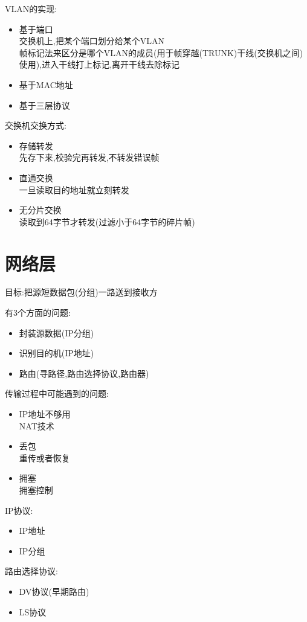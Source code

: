 \documentclass[UTF8,a4paper]{ctexart}
\begin{document}
VLAN的实现:
\begin{itemize}
  \item 基于端口\\
  交换机上,把某个端口划分给某个VLAN\\
  帧标记法来区分是哪个VLAN的成员(用于帧穿越(TRUNK)干线(交换机之间)使用),进入干线打上标记,离开干线去除标记
  \item 基于MAC地址
  \item 基于三层协议
\end{itemize}

交换机交换方式:
\begin{itemize}
  \item 存储转发\\
  先存下来,校验完再转发,不转发错误帧
  \item 直通交换\\
  一旦读取目的地址就立刻转发
  \item 无分片交换\\
  读取到64字节才转发(过滤小于64字节的碎片帧)
\end{itemize}

\section{网络层}
目标:把源短数据包(分组)一路送到接收方

有3个方面的问题:
\begin{itemize}
  \item 封装源数据(IP分组)
  \item 识别目的机(IP地址)
  \item 路由(寻路径,路由选择协议,路由器)
\end{itemize}

传输过程中可能遇到的问题:
\begin{itemize}
  \item IP地址不够用\\
  NAT技术
  \item 丢包\\
  重传或者恢复
  \item 拥塞\\
  拥塞控制
\end{itemize}

IP协议:
\begin{itemize}
  \item IP地址
  \item IP分组
\end{itemize}

路由选择协议:
\begin{itemize}
  \item DV协议(早期路由)
  \item LS协议
\end{itemize}
\end{document}
